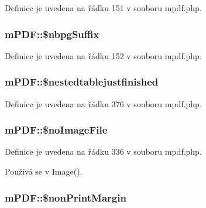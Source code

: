 Definice je uvedena na řádku 151 v souboru mpdf.\-php.

\hypertarget{classm_p_d_f_a11f7587b140781c619da10aa1386c245}{
\subsubsection[{\$nbpg\-Suffix}]{\setlength{\rightskip}{0pt plus 5cm}m\-P\-D\-F\-::\$nbpg\-Suffix}}\label{classm_p_d_f_a11f7587b140781c619da10aa1386c245}


Definice je uvedena na řádku 152 v souboru mpdf.\-php.

\hypertarget{classm_p_d_f_a81e8ccd64c27b26deb9e5d641d332805}{
\subsubsection[{\$nestedtablejustfinished}]{\setlength{\rightskip}{0pt plus 5cm}m\-P\-D\-F\-::\$nestedtablejustfinished}}\label{classm_p_d_f_a81e8ccd64c27b26deb9e5d641d332805}


Definice je uvedena na řádku 376 v souboru mpdf.\-php.

\hypertarget{classm_p_d_f_a713a22e64bd5994aef2e9624bfcf5ffd}{
\subsubsection[{\$no\-Image\-File}]{\setlength{\rightskip}{0pt plus 5cm}m\-P\-D\-F\-::\$no\-Image\-File}}\label{classm_p_d_f_a713a22e64bd5994aef2e9624bfcf5ffd}


Definice je uvedena na řádku 336 v souboru mpdf.\-php.



Používá se v Image().

\hypertarget{classm_p_d_f_a96c920e7a9ea8729afd34a5e57d3c997}{
\subsubsection[{\$non\-Print\-Margin}]{\setlength{\rightskip}{0pt plus 5cm}m\-P\-D\-F\-::\$non\-Print\-Margin}}\label{classm_p_d_f_a96c920e7a9ea8729afd34a5e57d3c997}


